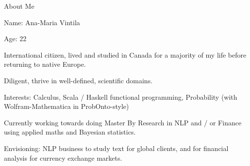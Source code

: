 

\begin{frame}{About Me}

\begin{itemizeSpaced}{10pt}
    \item Name: Ana-Maria Vintila
    \item Age: 22
    \item International citizen, lived and studied in Canada for a majority of my life before returning to native Europe. 
    \item Diligent, thrive in well-defined, scientific domains. 
    
    \item Interests: Calculus, Scala / Haskell functional programming, Probability (with Wolfram-Mathematica in ProbOnto-style)
    
    \item Currently working towards doing Master By Research in NLP and / or Finance using applied maths and Bayesian statistics. 
    
    \item Envisioning: NLP business to study text for global clients, and for financial analysis for currency exchange markets. 
    
\end{itemizeSpaced}
    
\end{frame}